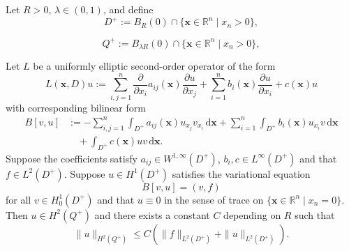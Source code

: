 \begin{Lemma}
\label{lem:flat-boundary-local-regularity}
Let $R>0$, $\lambda\in(0,1)$, and define
\begin{equation}\label{eq:flat-boundary-outer-half-ball}
D^+:=B_R(0)\cap\{\bm{x}\in\mathbb{R}^n\mid x_n>0\},
\end{equation}

\begin{equation}\label{eq:flat-boundary-inner-half-ball}
Q^+:=B_{\lambda R}(0)\cap\{\bm{x}\in\mathbb{R}^n\mid x_n>0\},
\end{equation}

\begin{equation}\label{eq:flat-boundary-source-isolated-empty-number}\end{equation}
Let $L$ be a uniformly elliptic second-order operator of the form\[L(\bm{x},D)u:=\sum_{i,j=1}^n\frac{\partial}{\partial x_i}a_{ij}(\bm{x})\frac{\partial u}{\partial x_j}+\sum_{i=1}^nb_i(\bm{x})\frac{\partial u}{\partial x_i}+c(\bm{x})u\]with corresponding bilinear form\[\begin{aligned}
B[v,u]&:=-\sum_{i,j=1}^n\int_{D^+}a_{ij}(\bm{x})u_{x_j}v_{x_i}\,\mathrm{d}\bm{x}+\sum_{i=1}^n\int_{D^+}b_i(\bm{x})u_{x_i}v\,\mathrm{d}\bm{x}\\
&\quad+\int_{D^+}c(\bm{x})uv\,\mathrm{d}\bm{x}.
\end{aligned}\]Suppose the coefficients satisfy $a_{ij}\in W^{1,\infty}(D^+)$, $b_i,c\in L^\infty(D^+)$ and that $f\in L^2(D^+)$. Suppose $u\in H^1(D^+)$ satisfies the variational equation
\begin{equation}\label{eq:flat-boundary-variational-equation}
B[v,u]=(v,f)
\end{equation}
for all $v\in H_0^1(D^+)$ and that $u\equiv0$ in the sense of trace on $\{\bm{x}\in\mathbb{R}^n\mid x_n=0\}$. Then $u\in H^2(Q^+)$ and there exists a constant $C$ depending on $R$ such that
\begin{equation}\label{eq:flat-boundary-local-h2-estimate}
\|u\|_{H^2(Q^+)}\leq C(\|f\|_{L^2(D^+)}+\|u\|_{L^2(D^+)}).
\end{equation}

\end{Lemma}
